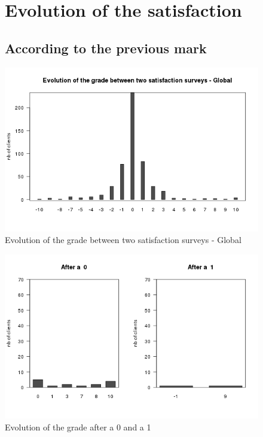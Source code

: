 \documentclass[a4paper, 11pt]{article}
\begin{document}
\clearpage

	\begin{figure}[!ht]
			\section{Evolution of the satisfaction}
		\label{app:evolution}
			\subsection{According to the previous mark}
		
            \centering
            \includegraphics[height = 10 cm]{Remi/Evolution_of_the_grade_between_two_satisfaction_surveys_-_Global.png}
            \caption{Evolution of the grade between two satisfaction surveys - Global}
            \label{fig:e_Global}
    \end{figure}

    \begin{figure}[!ht]
            \centering
            \includegraphics[height = 10 cm]{Remi/Evolution_of_the_grade_after_a_1.png}
            \caption{Evolution of the grade after a 0 and a 1}
            \label{fig:e_1}
    \end{figure}
\end{document}

